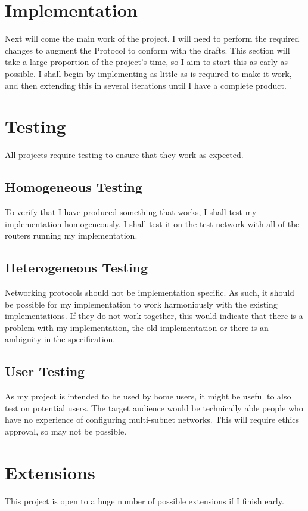 \documentclass[12pt]{report}
\begin{document}
\section{Implementation}
Next will come the main work of the project. I will need to perform the required
changes to augment the Protocol to conform with the drafts. This section will
take a large proportion of the project's time, so I aim to start this as early
as possible. I shall begin by implementing as little as is required to make it
work, and then extending this in several iterations until I have a complete
product.

\section{Testing}
All projects require testing to ensure that they work as expected.

\subsection{Homogeneous Testing}
To verify that I have produced something that works, I shall test my
implementation homogeneously. I shall test it on the test network with all of
the routers running my implementation.  

\subsection{Heterogeneous Testing}
Networking protocols should not be implementation specific. As such, it should
be possible for my implementation to work harmoniously with the existing
implementations. If they do not work together, this would indicate that there is
a problem with my implementation, the old implementation or there is an
ambiguity in the specification.

\subsection{User Testing}
As my project is intended to be used by home users, it might be useful to also
test on potential users. The target audience would be technically able people
who have no experience of configuring multi-subnet networks. This will 
require ethics approval, so may not be possible.

\section{Extensions}
This project is open to a huge number of possible extensions if I finish
early.
\end{document}
